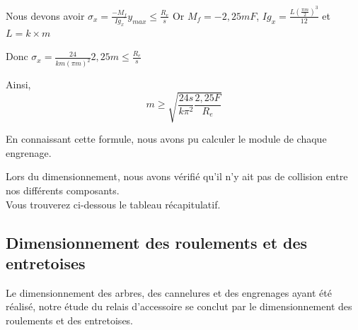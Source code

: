 \documentclass{config}
\begin{document}
\begin{spacing}{1.2}
Nous devons avoir $\sigma_{x} = \frac{- M_f}{Ig_x} y_{max} \leq \frac{R_e}{s}$
Or $M_f = -2,25 mF $,  $ Ig_x =\frac{L (\frac{\pi m}{2})^3}{12}$ et $L = k \times m$

Donc $\sigma_{x} = \frac{24}{k m (\pi m)^2} 2,25m \leq \frac{R_e}{s} $

Ainsi, \[ m \geq \sqrt{\frac{24 s}{ k \pi^2}\frac{2,25F}{R_e}}\]

En connaissant cette formule, nous avons pu calculer le module de chaque engrenage. 

Lors du dimensionnement, nous avons vérifié qu'il n'y ait pas de collision entre nos différents composants. 
\\Vous trouverez ci-dessous le tableau récapitulatif.


\begin{table}[h]
\centering
{}
\end{table}


\newpage
\subsection{Dimensionnement des roulements et des entretoises}
Le dimensionnement des arbres, des cannelures et des engrenages ayant été réalisé, notre étude du relais d'accessoire se conclut par le dimensionnement des roulements et des entretoises.


\end{spacing}
\end{document}
